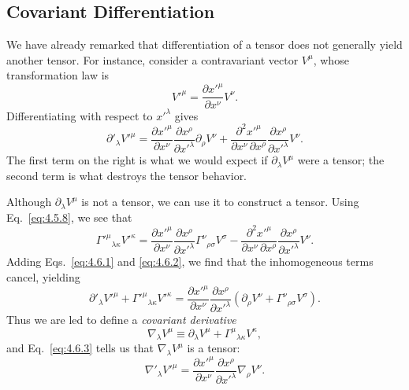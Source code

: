 
\subsection{Covariant Differentiation}\label{sec:4.6}

We have already remarked that differentiation of a tensor does not generally
yield another tensor. For instance, consider a contravariant vector \(V^\mu\),
whose transformation law is
\[
  V'^\mu=\frac{\partial x'^\mu}{\partial x^\nu}V^\nu.
\]
Differentiating with respect to \(x'^\lambda\) gives
\begin{equation}
  \partial'_\lambda V'^\mu
  =
  \frac{\partial x'^\mu}{\partial x^\nu}
  \frac{\partial x^\rho}{\partial x'^\lambda}
  \partial_\rho V^\nu
  +
  \frac{\partial^2x'^\mu}
       {\partial x^\nu\,\partial x^\rho}
  \frac{\partial x^\rho}{\partial x'^\lambda}V^\nu.
  \tag{4.6.1}\label{eq:4.6.1}
\end{equation}
The first term on the right is what we would expect if
\(\partial_\lambda V^\mu\) were a tensor; the second term is what destroys
the tensor behavior.

Although \(\partial_\lambda V^\mu\) is not a tensor, we can use it to
construct a tensor. Using Eq.~\eqref{eq:4.5.8}, we see that
\begin{equation}
  \Gamma'^\mu{}_{\lambda\kappa}V'^\kappa
  =
  \frac{\partial x'^\mu}{\partial x^\nu}
  \frac{\partial x^\rho}{\partial x'^\lambda}
  \Gamma^\nu{}_{\rho\sigma}V^\sigma
  -
  \frac{\partial^2x'^\mu}
       {\partial x^\nu\,\partial x^\rho}
  \frac{\partial x^\rho}{\partial x'^\lambda}V^\nu.
  \tag{4.6.2}\label{eq:4.6.2}
\end{equation}
Adding Eqs.~\eqref{eq:4.6.1} and \eqref{eq:4.6.2}, we find that the
inhomogeneous terms cancel, yielding
\begin{equation}
  \partial'_\lambda V'^\mu
  +\Gamma'^\mu{}_{\lambda\kappa}V'^\kappa
  =
  \frac{\partial x'^\mu}{\partial x^\nu}
  \frac{\partial x^\rho}{\partial x'^\lambda}
  \left(
    \partial_\rho V^\nu+\Gamma^\nu{}_{\rho\sigma}V^\sigma
  \right).
  \tag{4.6.3}\label{eq:4.6.3}
\end{equation}
Thus we are led to define a \textit{covariant derivative}
\begin{equation}
  \nabla_\lambda V^\mu
  \equiv
  \partial_\lambda V^\mu+\Gamma^\mu{}_{\lambda\kappa}V^\kappa,
  \tag{4.6.4}\label{eq:4.6.4}
\end{equation}
and Eq.~\eqref{eq:4.6.3} tells us that \(\nabla_\lambda V^\mu\) is a
tensor:
\[
  \nabla'_\lambda V'^\mu
  =
  \frac{\partial x'^\mu}{\partial x^\nu}
  \frac{\partial x^\rho}{\partial x'^\lambda}
  \nabla_\rho V^\nu.
\]


